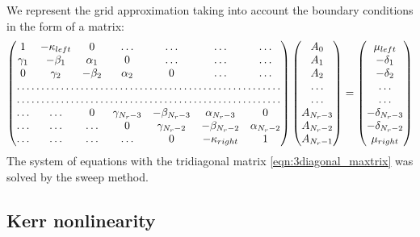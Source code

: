 \documentclass[a4paper, 12pt]{article}
\begin{document}
We represent the grid approximation taking into account the boundary conditions in the form of a matrix:
\begin{equation}
\label{eqn:3diagonal_maxtrix}
\begin{pmatrix}
1 & -\kappa_{left} & 0 & \dots & \dots & \dots & \dots\\
\gamma_1 & -\beta_1 & \alpha_1 & 0 & \dots & \dots & \dots\\
0 & \gamma_2 & -\beta_2 & \alpha_2 & 0 & \dots & \dots\\
\hdotsfor{7}\\
\hdotsfor{7}\\
\dots &\dots & 0 & \gamma_{N_r-3} & -\beta_{N_r-3} & \alpha_{N_r-3} & 0\\
\dots & \dots &\dots & 0 & \gamma_{N_r-2} & -\beta_{N_r-2} & \alpha_{N_r-2}\\
\dots &\dots &\dots &\dots & 0 & -\kappa_{right} & 1\\
\end{pmatrix}
\begin{pmatrix}
A_0 \\
A_1 \\
A_2 \\
\dots \\
\dots \\
A_{N_r-3} \\
A_{N_r-2} \\
A_{N_r-1}
\end{pmatrix}
=
\begin{pmatrix}
\mu_{left} \\
-\delta_1\\
-\delta_2\\
\dots \\
\dots \\
-\delta_{N_r-3}\\
-\delta_{N_r-2}\\
\mu_{right}
\end{pmatrix}
\end{equation}
The system of equations with the tridiagonal matrix \eqref{eqn:3diagonal_maxtrix} was solved by the sweep method.

\subsection{Kerr nonlinearity}
\end{document}
